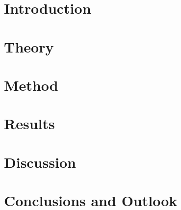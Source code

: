 \mainmatter

\chapter{Introduction}
\label{cha:introduction}


\vspace{\fill}

\newpage

\chapter{Theory}
\label{cha:theory}


\vspace{\fill}

\newpage

\chapter{Method}
\label{cha:method}


\vspace{\fill}

\newpage

%
%

\chapter{Results}
\label{cha:results}



{}
\chapter{Discussion}
\label{cha:discussion}


\clearpage

\chapter{Conclusions and Outlook}
\label{cha:conclusions}


\clearpage





